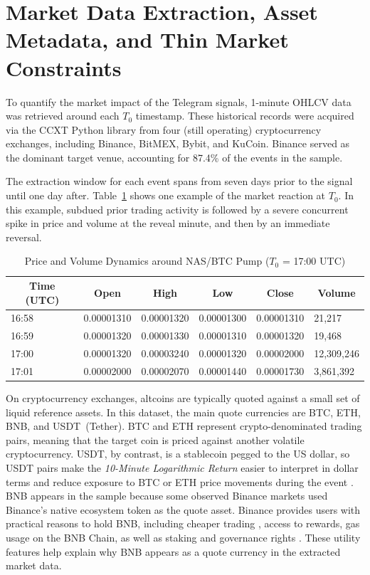 \section{Market Data Extraction, Asset Metadata, and Thin Market Constraints}
\label{sec:market-extraction}
\label{sec:metadata-constraints}

To quantify the market impact of the Telegram signals, 1-minute OHLCV data was retrieved around each $T_0$ timestamp. These historical records were acquired via the CCXT Python library \cite{ccxt2023} from four (still operating) cryptocurrency exchanges, including Binance, BitMEX, Bybit, and KuCoin. Binance served as the dominant target venue, accounting for 87.4\% of the events in the sample.

The extraction window for each event spans from seven days prior to the signal until one day after. Table~\ref{tab:ohlcv-example} shows one example of the market reaction at $T_0$. In this example, subdued prior trading activity is followed by a severe concurrent spike in price and volume at the reveal minute, and then by an immediate reversal.

\begin{table}[H]
\centering
\caption{Price and Volume Dynamics around NAS/BTC Pump ($T_0$ = 17:00 UTC)}
\label{tab:ohlcv-example}
\begin{tabular}{|l|l|l|l|l|l|}
\toprule
\multicolumn{1}{|c|}{\textbf{Time (UTC)}} & \multicolumn{1}{c|}{\textbf{Open}} & \multicolumn{1}{c|}{\textbf{High}} & \multicolumn{1}{c|}{\textbf{Low}} & \multicolumn{1}{c|}{\textbf{Close}} & \multicolumn{1}{c|}{\textbf{Volume}} \\
\midrule
16:58 & 0.00001310 & 0.00001320 & 0.00001300 & 0.00001310 & 21,217 \\
16:59 & 0.00001320 & 0.00001330 & 0.00001310 & 0.00001320 & 19,468 \\
17:00 & 0.00001320 & 0.00003240 & 0.00001320 & 0.00002000 & 12,309,246 \\
17:01 & 0.00002000 & 0.00002070 & 0.00001440 & 0.00001730 & 3,861,392 \\
\bottomrule
\end{tabular}
\datasetsource
\end{table}


On cryptocurrency exchanges, altcoins are typically quoted against a small set of liquid reference assets. In this dataset, the main quote currencies are BTC, ETH, BNB, and USDT~(Tether). BTC and ETH represent crypto-denominated trading pairs, meaning that the target coin is priced against another volatile cryptocurrency. USDT, by contrast, is a stablecoin pegged to the US dollar, so USDT pairs make the \textit{10-Minute Logarithmic Return} easier to interpret in dollar terms and reduce exposure to BTC or ETH price movements during the event \cite{tether2026howitworks}. BNB appears in the sample because some observed Binance markets used Binance's native ecosystem token as the quote asset. Binance provides users with practical reasons to hold BNB, including cheaper trading \cite{binanceus2026bnbfees}, access to rewards, gas usage on the BNB Chain, as well as staking and governance rights \cite{binanceacademy2025bnb}. These utility features help explain why BNB appears as a quote currency in the extracted market data.

